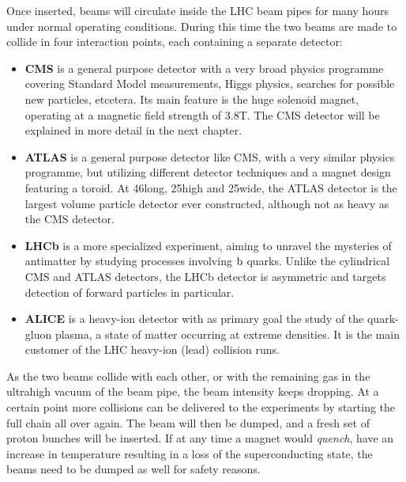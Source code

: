 Once inserted, beams will circulate inside the LHC beam pipes for many hours under
normal operating conditions. During this time the two beams are made to collide in four interaction
points, each containing a separate detector: 
\begin{itemize}
  \item \textbf{CMS} is a general purpose detector with a very broad physics programme covering
Standard Model measurements, Higgs physics, searches for possible new particles, etcetera. Its
main feature is the huge solenoid magnet, operating at a magnetic field strength of 3.8\unit{T}. The
CMS detector will be explained in more detail in the next chapter. 
  \item \textbf{ATLAS} is a general purpose detector like CMS, with a very similar physics
programme, but utilizing different detector techniques and a magnet design featuring a toroid. At
46\meter long, 25\meter high and 25\meter wide, the ATLAS detector is the largest volume particle
detector ever constructed, although not as heavy as the CMS detector. 
  \item \textbf{LHCb} is a more specialized experiment, aiming to unravel the mysteries of
antimatter by studying processes involving $\mathrm{b}$ quarks. Unlike the cylindrical CMS and ATLAS
detectors, the LHCb detector is asymmetric and targets detection of forward particles in particular.
  \item \textbf{ALICE} is a heavy-ion detector with as primary goal the study of the quark-gluon
plasma, a state of matter occurring at extreme densities. It is the main customer of the LHC
heavy-ion (lead) collision runs.
\end{itemize}
As the two beams collide with each other, or with the remaining gas in the ultrahigh vacuum of
the beam pipe, the beam
intensity keeps dropping. At a certain point more collisions can be delivered to the experiments by
starting the full chain all over again. The beam will then be dumped, and a fresh set of proton
bunches will be inserted. 
If at any time a magnet would \textit{quench}, have an increase in temperature resulting in a loss
of the superconducting state, the beams need to be dumped as well for safety reasons.  

